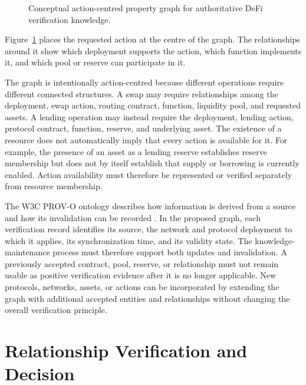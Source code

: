 \begin{figure}[H]
    \centering
    \resizebox{0.95\textwidth}{!}{%
    }
    \caption{Conceptual action-centred property graph for authoritative
    DeFi verification knowledge.}
    \label{fig:conceptual_graph_model}
\end{figure}

Figure~\ref{fig:conceptual_graph_model} places the requested action at the
centre of the graph. The relationships around it show which deployment
supports the action, which function implements it, and which pool or
reserve can participate in it.

The graph is intentionally action-centred because different operations require
different connected structures. A swap may require relationships among the
deployment, swap action, routing contract, function, liquidity pool, and
requested assets. A lending operation may instead require the deployment,
lending action, protocol contract, function, reserve, and underlying asset. The existence of a resource does not automatically imply that every action is
available for it. For example, the presence of an asset as a lending reserve
establishes reserve membership but does not by itself establish that supply or
borrowing is currently enabled. Action availability must therefore be
represented or verified separately from resource membership.

The W3C PROV-O ontology describes how information is derived from a source
and how its invalidation can be recorded \cite{w3cPROVO2013}. In the
proposed graph, each verification record identifies its source, the network
and protocol deployment to which it applies, its synchronization time, and
its validity state. The knowledge-maintenance process must therefore support both updates and
invalidation. A previously accepted contract, pool, reserve, or relationship
must not remain usable as positive verification evidence after it is no longer
applicable. New protocols, networks, assets, or actions can be incorporated by
extending the graph with additional accepted entities and relationships without
changing the overall verification principle.



\section{Relationship Verification and Decision}
\label{sec:relationship_verification}

